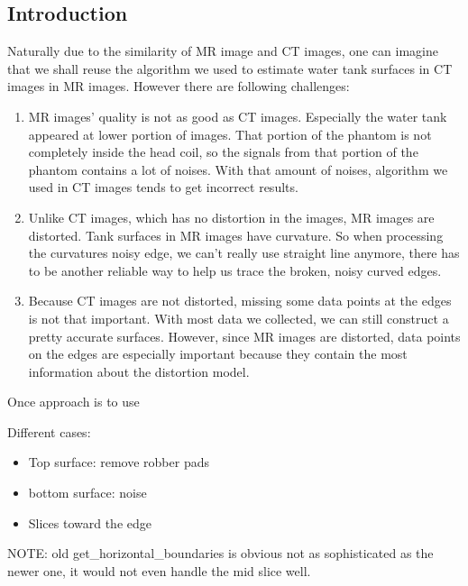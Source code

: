
\subsection{Introduction}
Naturally due to the similarity of MR image and CT images, one can imagine that we shall reuse the algorithm
we used to estimate water tank surfaces in CT images in MR images. However there are following challenges:
\begin{enumerate}
  \item MR images' quality is not as good as CT images. Especially the water tank appeared at lower portion
    of images. That portion of the phantom is not completely inside the head coil, so the signals from that
    portion of the phantom contains a lot of noises. With that amount of noises, algorithm we used in CT 
    images tends to get incorrect results. %
  \item Unlike CT images, which has no distortion in the images, MR images are distorted. Tank surfaces
    in MR images have curvature. So when processing the curvatures noisy edge, we can't really use straight
    line anymore, there has to be another reliable way to help us trace the broken, noisy curved edges.
  \item Because CT images are not distorted, missing some data points at the edges is not that important.
    With most data we collected, we can still construct a pretty accurate surfaces. However, since MR images
    are distorted, data points on the edges are especially important because they contain the most information
    about the distortion model.
\end{enumerate}

Once approach is to use 

Different cases:
\begin{itemize}
\item Top surface: remove robber pads
\item bottom surface: noise
\item Slices toward the edge %
\end{itemize}

NOTE: old get_horizontal_boundaries is obvious not as sophisticated as the newer one, it would not even handle
the mid slice well.

